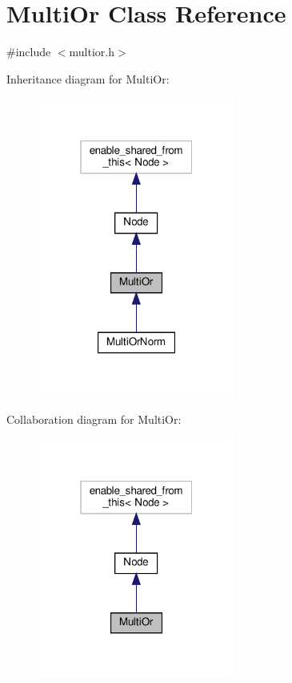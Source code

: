 \hypertarget{class_multi_or}{}\section{Multi\+Or Class Reference}
\label{class_multi_or}


{\ttfamily \#include $<$multior.\+h$>$}



Inheritance diagram for Multi\+Or\+:\nopagebreak
\begin{figure}[H]
\begin{center}
\leavevmode
\includegraphics[width=184pt]{d3/d60/class_multi_or__inherit__graph}
\end{center}
\end{figure}


Collaboration diagram for Multi\+Or\+:\nopagebreak
\begin{figure}[H]
\begin{center}
\leavevmode
\includegraphics[width=184pt]{df/dcb/class_multi_or__coll__graph}
\end{center}
\end{figure}
